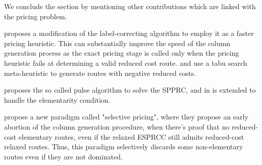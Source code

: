\begin{comment}
\parencite{condardo2014}
Irnich and Villeneuve [15] used this observation to develop the so-called SPPRC
with k-cycle elimination (k-cyc-SPPRC), in which short cycles (in terms of the number of customers visited between two
consecutive appearances of a given node) are forbidden whereas long cycles (in terms of the same number) are still allowed.
The advantage of the ng-SPPRC with respect to k-cyc-SPPRC is how the length of a cycle is defined. Indeed, the number of
customers between two appearances of a node may not be the right criterion, the length of the cycle in terms of distance
being a better measure of the impact of a cycle in the linear relaxation lower bound. The ng-SPPRC thus forbids cycles that
are short with respect to the time consumption regardless of the number of nodes between two appearences of a given
customer.

\parencite{costa2019}
Given that long cycles in terms of distance
have not much chance to appear in an MP optimal
solution, the ng-SPPRC represents a powerful relaxa-
tion.
An important parameter in the ng-SPPRC is Δ, the
size of the neighborhoods, which is normally de-
ﬁned a priori and interferes on the labeling algorithm
complexity. On the one hand, the larger the value of Δ,
the closer to the ESPPRC the ng-SPPRC becomes. On
the other hand, the algorithm complexity increases ex-
ponentially with the value of Δ. Baldacci, Mingozzi, and
Roberti (2011) show that Δ  8 represents a good
trade-off between lower bound quality and computing
time for the VRPTW.
\end{comment}


\medskip

We conclude the section by mentioning other contributions
which are linked with the pricing problem.

\textcite{fukasawa2006} proposes a modification of the label-correcting
algorithm to employ it as a faster pricing heuristic.
This can substantially improve the speed of the column generation process
as the exact pricing stage is called only when the pricing heuristic
fails at determining a valid reduced cost route.
\textcite{desaulniers2008} and \textcite{archetti2011} use a tabu search
meta-heuristic to generate routes with negative reduced costs.

\textcite{lozano2013} proposes the so called pulse algorithm
to solve the SPPRC, and in \textcite{lozano2016} is extended to handle
the elementarity condition.

\textcite{desaulniers2019} propose a new paradigm called "selective pricing",
where they propose an early abortion of the column generation procedure,
when there's proof that no reduced-cost elementary routes,
even if the relaxed ESPRCC still admits reduced-cost relaxed routes.
Thus, this paradigm selectively discards some non-elementary routes even
if they are not dominated.

